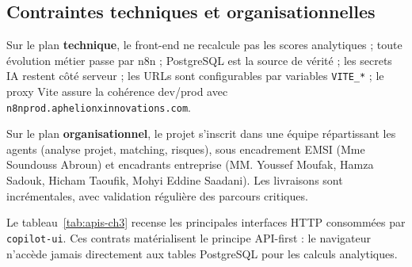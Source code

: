\subsection{Contraintes techniques et organisationnelles}

Sur le plan \textbf{technique}, le front-end ne recalcule pas les scores analytiques ; toute évolution métier passe par n8n ; PostgreSQL est la source de vérité ; les secrets IA restent côté serveur ; les URLs sont configurables par variables \texttt{VITE\_*} ; le proxy Vite assure la cohérence dev/prod avec \texttt{n8nprod.aphelionxinnovations.com}.

Sur le plan \textbf{organisationnel}, le projet s'inscrit dans une équipe répartissant les agents (analyse projet, matching, risques), sous encadrement EMSI (Mme Soundouss Abroun) et encadrants entreprise (MM. Youssef Moufak, Hamza Sadouk, Hicham Taoufik, Mohyi Eddine Saadani). Les livraisons sont incrémentales, avec validation régulière des parcours critiques.

Le tableau~\ref{tab:apis-ch3} recense les principales interfaces HTTP consommées par \texttt{copilot-ui}. Ces contrats matérialisent le principe API-first : le navigateur n'accède jamais directement aux tables PostgreSQL pour les calculs analytiques.

